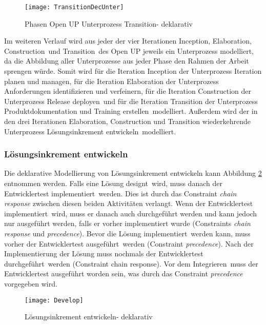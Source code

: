 \begin{figure}[htp]
\begin{center}
  \texttt{[image: TransitionDecUnter]} %
  \caption{Phasen Open UP Unterprozess Transition- deklarativ}
  \label{fig:TransitionDecUnter}
\end{center}
\end{figure}




Im weiteren Verlauf wird aus jeder der vier Iterationen \grqq Inception\grqq , \grqq Elaboration\grqq, \grqq Construction\grqq \  und \grqq Transition\grqq \  des Open UP jeweils ein Unterprozess modelliert, da die Abbildung aller Unterprozesse aus jeder Phase den Rahmen der Arbeit sprengen würde. \newline
Somit wird für die Iteration Inception der Unterprozess \grqq Iteration planen und managen\grqq, für die Iteration Elaboration der Unterprozess \grqq Anforderungen identifizieren und verfeinern\grqq, für die Iteration Construction der Unterprozess \grqq Release deployen\grqq \  und für die Iteration Transition der Unterprozess \grqq Produktdokumentation und Training erstellen\grqq \  modelliert. Außerdem wird der in den drei Iterationen Elaboration, Construction und Transition wiederkehrende Unterprozess \grqq Lösungsinkrement entwickeln\grqq \  modelliert.


 \subsubsection{Lösungsinkrement entwickeln}

Die deklarative Modellierung von Lösungsinkrement entwickeln kann Abbildung \ref{fig:Develop} entnommen werden.
Falls eine \grqq Lösung designt\grqq \ wird, muss danach der \grqq Entwicklertest implementiert\grqq \ werden. Dies ist durch das Constraint \textit{chain response} zwischen diesen beiden Aktivitäten verlangt. Wenn der \grqq Entwicklertest implementiert\grqq \ wird, muss er danach auch durchgeführt werden und kann jedoch nur ausgeführt werden, falls er vorher implementiert wurde (Constraints \textit{chain response} und \textit{precedence}).
Bevor die \grqq Lösung implementiert\grqq \ werden kann, muss vorher der \grqq Entwicklertest ausgeführt\grqq \ werden (Constraint \textit{precedence}). Nach der Implementierung der Lösung muss nochmals der \grqq Entwicklertest durchgeführt\grqq \ werden (Constraint chain response).\newline
Vor dem \grqq Integrieren\grqq \ muss der Entwicklertest ausgeführt worden sein, was durch das Constraint \textit{precedence} vorgegeben wird.
\begin{figure}[htp]
\begin{center}
  \texttt{[image: Develop]} %
  \caption{Lösungsinkrement entwickeln- deklarativ}
  \label{fig:Develop}
\end{center}
\end{figure}

